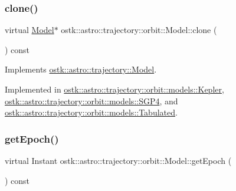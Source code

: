 \mbox{\label{classostk_1_1astro_1_1trajectory_1_1orbit_1_1_model_a53dc07564e4c7c444da46360aa8ada15}} 
\subsubsection{\texorpdfstring{clone()}{clone()}}
{\footnotesize\ttfamily virtual \hyperlink{classostk_1_1astro_1_1trajectory_1_1orbit_1_1_model}{Model}$\ast$ ostk\+::astro\+::trajectory\+::orbit\+::\+Model\+::clone (\begin{DoxyParamCaption}{ }\end{DoxyParamCaption}) const\hspace{0.3cm}{\ttfamily [pure virtual]}}



Implements \hyperlink{classostk_1_1astro_1_1trajectory_1_1_model_ad9f1467f711b07796ddc1437fb9ad9df}{ostk\+::astro\+::trajectory\+::\+Model}.



Implemented in \hyperlink{classostk_1_1astro_1_1trajectory_1_1orbit_1_1models_1_1_kepler_afb76b3571c73fb5c87129033f7d66520}{ostk\+::astro\+::trajectory\+::orbit\+::models\+::\+Kepler}, \hyperlink{classostk_1_1astro_1_1trajectory_1_1orbit_1_1models_1_1_s_g_p4_afb9928e09d66c13a77eb1126da6139eb}{ostk\+::astro\+::trajectory\+::orbit\+::models\+::\+S\+G\+P4}, and \hyperlink{classostk_1_1astro_1_1trajectory_1_1orbit_1_1models_1_1_tabulated_a53603727c33f9ff8db520831cf666142}{ostk\+::astro\+::trajectory\+::orbit\+::models\+::\+Tabulated}.

\mbox{\label{classostk_1_1astro_1_1trajectory_1_1orbit_1_1_model_a22055d5ab4c22e6177a3ddb8f45f1f9b}} 
\subsubsection{\texorpdfstring{get\+Epoch()}{getEpoch()}}
{\footnotesize\ttfamily virtual Instant ostk\+::astro\+::trajectory\+::orbit\+::\+Model\+::get\+Epoch (\begin{DoxyParamCaption}{ }\end{DoxyParamCaption}) const\hspace{0.3cm}{\ttfamily [pure virtual]}}



